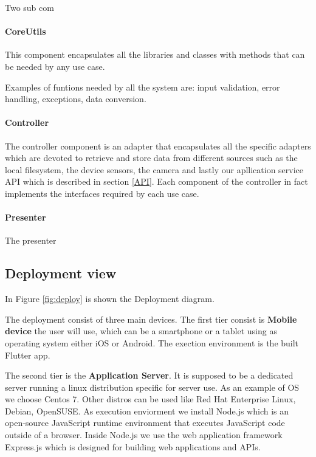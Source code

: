 Two sub com

\paragraph{CoreUtils}
This component encapsulates all the libraries and classes with methods that can be needed by any use case.

Examples of funtions needed by all the system are: input validation, error handling, exceptions, data conversion.



\paragraph{Controller}

The controller component is an adapter that encapsulates all the specific adapters which are devoted to retrieve and store data from different sources such as the local filesystem, the device sensors, the camera and lastly our apllication service API which is described in section \ref{API}.
Each component of the controller in fact implements the interfaces required by each use case.


\paragraph{Presenter}
The presenter












\subsection{Deployment view}

In Figure \ref{fig:deploy} is shown the Deployment diagram.

The deployment consist of three main devices. The first tier consist is \textbf{Mobile device} the user will use, which can be a smartphone or a tablet using as operating system either iOS or Android.
The exection environment is the built Flutter app.


The second tier is the \textbf{Application Server}. It is supposed to be a dedicated server running a linux distribution specific for server use. As an example of OS we choose Centos 7. Other distros can be used like Red Hat Enterprise Linux, Debian, OpenSUSE.
As execution enviorment we install Node.js which is an open-source JavaScript runtime environment that executes JavaScript code outside of a browser. Inside Node.js we use the web application framework Express.js which is designed for building web applications and APIs.


